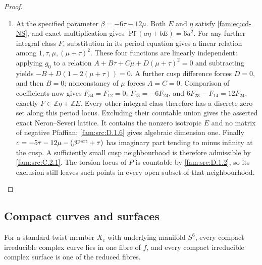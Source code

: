 \begin{proof}
\begin{enumerate}[label=\arabic*.,leftmargin=*]
\item At the specified parameter $\beta=-6\tau-12\mu$. Both $E$ and $\eta$
satisfy \eqref{fam:eq:cd-NS}, and exact multiplication gives
$\operatorname{Pf}(a\eta+bE)=6a^2$.
For any further integral class $F$, substitution in its period equation
gives a linear relation among $1,\tau,\mu,(\mu+\tau)^2$.
These four functions are linearly independent: applying $g_0$ to a
relation $A+B\tau+C\mu+D(\mu+\tau)^2=0$ and subtracting yields
$-B+D(1-2(\mu+\tau))=0$. A further cusp difference forces $D=0$,
and then $B=0$; nonconstancy of $\mu$ forces $A=C=0$.
Comparison of coefficients now gives
$F_{34}=F_{12}=0$, $F_{13}=-6F_{24}$, and
$6F_{23}-F_{14}=12F_{24}$, exactly
$F\in\mathbb Z\eta+\mathbb ZE$. Every other integral class therefore
has a discrete zero set along this period locus. Excluding their
countable union gives the asserted exact Neron--Severi lattice.
It contains the nonzero isotropic $E$ and no matrix of negative
Pfaffian; \ref{fam:src:D.1.6} gives algebraic dimension one.
Finally
$c=-5\tau-12\mu-(\beta^{\rm part}+\tau)$ has imaginary part tending
to minus infinity at the cusp. A sufficiently small cusp neighbourhood
is therefore admissible by \ref{fam:src:C.2.1}. The torsion locus of $P$ is countable
by \ref{fam:src:D.1.2}, so its exclusion still leaves such points in every open subset
of that neighbourhood.
\end{enumerate}
\end{proof}

\subsection{Compact curves and surfaces}\hypertarget{tag-01PR}{}\label{fam:section:D.2}
\begin{proposition}\hypertarget{tag-01QY}{}\label{fam:src:D.2.1}\label{fam:st:D.2.1}

For a standard-twist member \(X_c\) with underlying manifold \(S^6\),
every compact irreducible complex curve lies in one fibre of \(f\), and
every compact irreducible complex surface is one of the reduced fibres.
\end{proposition}


